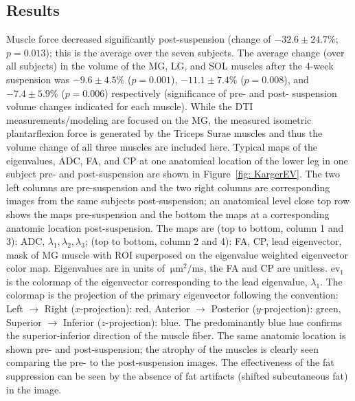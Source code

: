 \subsection{Results}
Muscle force decreased significantly post-suspension (change of $-32.6 \pm 24.7\%$; $p=0.013$); this is the average over the seven subjects. 
The average change (over all subjects) in the volume of the MG, LG, and SOL muscles after the 4-week suspension was $-9.6 \pm 4.5\%$ ($p=0.001$), $-11.1 \pm 7.4\%$ ($p=0.008$), and $-7.4 \pm 5.9\%$ ($p=0.006$) respectively (significance of pre- and post- suspension volume changes indicated for each muscle).
While the DTI measurements/modeling are focused on the MG, the measured isometric plantarflexion force is generated by the Triceps Surae muscles and thus the volume change of all three muscles are included here. 
Typical maps of the eigenvalues, ADC, FA, and CP at one anatomical location of the lower leg in one subject pre- and post-suspension are shown in Figure~\ref{fig: KargerEV}. 
The two left columns are pre-suspension and the two right columns are corresponding images from the same subjects post-suspension; 
an anatomical level close top row shows the maps pre-suspension and the bottom the maps at a corresponding anatomic location post-suspension. 
The maps are (top to bottom, column 1 and 3): ADC, $\lambda_1, \lambda_2, \lambda_3$; (top to bottom, column 2 and 4): FA, CP, lead eigenvector, mask of MG muscle with ROI superposed on the eigenvalue weighted eigenvector color map. 
Eigenvalues are in units of $\SI{}{\micro\meter^2 / \milli\second}$, the FA and CP are unitless. $\mathrm{ev}_1$ is the colormap of the eigenvector corresponding to the lead eigenvalue, $\lambda_1$. 
The colormap is the projection of the primary eigenvector following the convention: Left $\rightarrow$ Right ($x$-projection): red, Anterior $\rightarrow$ Posterior ($y$-projection): green, Superior $\rightarrow$ Inferior ($z$-projection): blue. 
The predominantly blue hue confirms the superior-inferior direction of the muscle fiber. 
The same anatomic location is shown pre- and post-suspension; 
the atrophy of the muscles is clearly seen comparing the pre- to the post-suspension images. 
The effectiveness of the fat suppression can be seen by the absence of fat artifacts (shifted subcutaneous fat) in the image.
